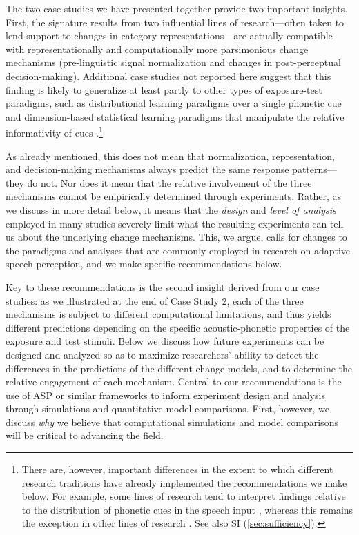 \documentclass[
  11pt,
  man,floatsintext]{apa6}
\begin{document}
The two case studies we have presented together provide two important insights. First, the signature results from two influential lines of research---often taken to lend support to changes in category representations---are actually compatible with representationally and computationally more parsimonious change mechanisms (pre-linguistic signal normalization and changes in post-perceptual decision-making). Additional case studies not reported here suggest that this finding is likely to generalize at least partly to other types of exposure-test paradigms, such as distributional learning paradigms over a single phonetic cue \autocite{clayards2008,kleinschmidt-jaeger2016cogsci} and dimension-based statistical learning paradigms that manipulate the relative informativity of cues \autocite{idemaru-holt2011,idemaru-holt2020}.\footnote{There are, however, important differences in the extent to which different research traditions have already implemented the recommendations we make below. For example, some lines of research tend to interpret findings relative to the distribution of phonetic cues in the speech input \autocites[e.g., studies on distributional learning,][]{bejjanki2011,clayards2008,kleinschmidt-jaeger2016pbr,malone2021}[studies on dimension-based statistical learning,][]{idemaru-holt2020,schertz2015}[for review, see][]{schertz-clare2020}, whereas this remains the exception in other lines of research \autocites[but see, e.g.,][]{hitczenko-feldman2016}[ for accent adaptation]{tan2021}{drouin2016}[ for perceptual recalibration]{theodore-monto2019}. See also SI (\ref{sec:sufficiency}).}

As already mentioned, this does not mean that normalization, representation, and decision-making mechanisms always predict the same response patterns---they do not. Nor does it mean that the relative involvement of the three mechanisms cannot be empirically determined through experiments. Rather, as we discuss in more detail below, it means that the \emph{design} and \emph{level of analysis} employed in many studies severely limit what the resulting experiments can tell us about the underlying change mechanisms. This, we argue, calls for changes to the paradigms and analyses that are commonly employed in research on adaptive speech perception, and we make specific recommendations below.

Key to these recommendations is the second insight derived from our case studies: as we illustrated at the end of Case Study 2, each of the three mechanisms is subject to different computational limitations, and thus yields different predictions depending on the specific acoustic-phonetic properties of the exposure and test stimuli. Below we discuss how future experiments can be designed and analyzed so as to maximize researchers' ability to detect the differences in the predictions of the different change models, and to determine the relative engagement of each mechanism. Central to our recommendations is the use of ASP or similar frameworks to inform experiment design and analysis through simulations and quantitative model comparisons. First, however, we discuss \emph{why} we believe that computational simulations and model comparisons will be critical to advancing the field.
\end{document}
